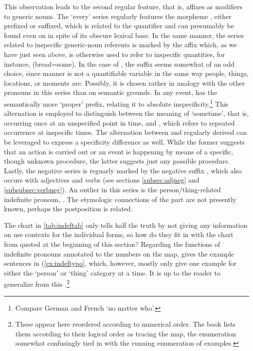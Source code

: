 This observation leads to the second regular feature, that is, affixes as 
modifiers to generic nouns. The `every' series regularly features the 
morpheme , either prefixed or suffixed, which is related to the 
quantifier  and can presumably be found 
even on  in spite of its obscure lexical base. In the same 
manner, the series related to inspecific generic-noun referents is marked by 
the affix  which, as we have just seen above, is otherwise 
used to refer to inspecific quantities, for instance, 
 (bread=some). In the case of 
, the suffix seems somewhat of an 
odd choice, since manner is not a quantifiable variable in the same way people,
things, locations, or moments are. Possibly, it is chosen rather in analogy
with the other pronouns in this series than on semantic grounds. In any event,
 has the semantically more `proper'  prefix,
relating it to absolute inspecificity.\footnote{Compare German
 and French  `no matter who'.} This 
alternation is employed to distinguish between the meaning of `sometime', that 
is, occurring once at an unspecified point in time, and 
, which refers to repeated occurrence at
inspecific times. The alternation between  and
regularly derived  can be leveraged to express a
specificity difference as well. While the former suggests that an action is
carried out or an event is happening by means of a specific, though unknown
procedure, the latter suggests just any possible procedure. Lastly, the
negative series is reguarly marked by the negative suffix ,
which also occurs with adjectives and verbs (see sections \ref{subsec:adjneg}
and \ref{subsubsec:verbneg}). An outlier in this series is the 
person/thing-related indefinite pronoun, . The etymologic 
connections of the  part are not presently known, perhaps the 
postposition  is related.

The chart in \autoref{tab:indeftab} only tells half the truth by not giving any
information on use contexts for the individual forms, so how do they fit in
with the chart from \citet{haspelmath1997} quoted at the beginning of this
section? Regarding the functions of indefinite pronouns annotated to the
numbers on the map, \citet{haspelmath1997} gives the example sentences in
(\ref{ex:indeftypo}, which, however, mostly only give one example for either
the `person' or `thing' category at a time. It is up to the reader to
generalize from this \citep[2--3]{haspelmath1997}.\footnote{These appear here
reordered according to numerical order. The book lists them according to their
logical order as tracing the map, the enumeration somewhat confusingly tied in
with the running enumeration of examples.}

